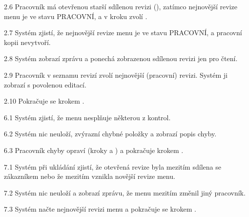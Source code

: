 \begin{ucalt}
  \item[2.6]\label{uc:08:2.6} Pracovník má otevřenou starší sdílenou revizi (), zatímco nejnovější revize menu je ve stavu PRACOVNÍ, a v kroku  zvolí .
  \item[2.7]\label{uc:08:2.7} Systém zjistí, že nejnovější revize menu je ve stavu PRACOVNÍ, a pracovní kopii nevytvoří.
  \item[2.8]\label{uc:08:2.8} Systém zobrazí zprávu  a ponechá zobrazenou sdílenou revizi jen pro čtení.
  \item[2.9]\label{uc:08:2.9} Pracovník v seznamu revizí zvolí nejnovější (pracovní) revizi. Systém ji zobrazí s povolenou editací.
  \item[2.10]\label{uc:08:2.10} Pokračuje se krokem .
\end{ucalt}

\begin{ucalt}
  \item[6.1]\label{uc:08:6.1} Systém zjistí, že menu nesplňuje některou z kontrol.
  \item[6.2]\label{uc:08:6.2} Systém nic neuloží, zvýrazní chybné položky a zobrazí popis chyby.
  \item[6.3]\label{uc:08:6.3} Pracovník chyby opraví (kroky  a ) a pokračuje krokem .
\end{ucalt}

\begin{ucalt}
  \item[7.1]\label{uc:08:7.1} Systém při ukládání zjistí, že otevřená revize byla mezitím sdílena se zákazníkem nebo že mezitím vznikla novější revize menu.
  \item[7.2]\label{uc:08:7.2} Systém nic neuloží a zobrazí zprávu, že menu mezitím změnil jiný pracovník.
  \item[7.3]\label{uc:08:7.3} Systém načte nejnovější revizi menu a pokračuje se krokem .
\end{ucalt}

